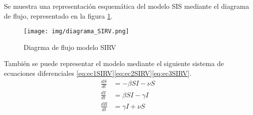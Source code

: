 Se muestra una representación esquemática del modelo SIS mediante el diagrama de flujo, representado en la figura \ref{fig:ejemplo SIRV}.

\begin{figure}[H]
    \centering
    \texttt{[image: img/diagrama\_SIRV.png]}
    \caption{Diagrma de flujo modelo SIRV}
    \label{fig:ejemplo SIRV}
    \vspace{0.5cm} %
\end{figure}

También se puede representar el modelo mediante el siguiente sistema de ecuaciones diferenciales \eqref{eq:ec1SIRV}\eqref{eq:ec2SIRV}\eqref{eq:ec3SIRV}.
\begin{align}
\frac{dS}{dt} &= -\beta SI - \nu S \label{eq:ec1SIRV} \\
\frac{dI}{dt} &= \beta SI - \gamma I \label{eq:ec2SIRV} \\
\frac{dR}{dt} &= \gamma I + \nu S \label{eq:ec3SIRV}
\end{align}

